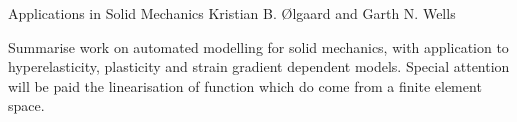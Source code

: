               {Applications in Solid Mechanics}
              {Kristian B. {\O}lgaard and Garth N. Wells}

\editornote{[oelgaard-1]}

Summarise work on automated modelling for solid mechanics, with
application to hyperelasticity, plasticity and strain gradient
dependent models. Special attention will be paid the linearisation of
function which do come from a finite element space.
